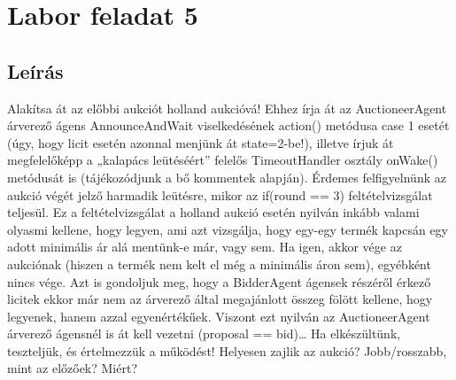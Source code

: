 \section{Labor feladat 5}
\subsection{Leírás}
Alakítsa át az előbbi aukciót holland aukcióvá! Ehhez írja át az AuctioneerAgent
árverező ágens AnnounceAndWait viselkedésének action() metódusa case 1 esetét
(úgy, hogy licit esetén azonnal menjünk át state=2-be!), illetve írjuk át megfelelőképp a
„kalapács leütéséért” felelős TimeoutHandler osztály onWake() metódusát is
(tájékozódjunk a bő kommentek alapján). Érdemes felfigyelnünk az aukció végét jelző
harmadik leütésre, mikor az if(round == 3) feltételvizsgálat teljesül. Ez a
feltételvizsgálat a holland aukció esetén nyilván inkább valami olyasmi kellene, hogy legyen,
ami azt vizsgálja, hogy egy-egy termék kapcsán egy adott minimális ár alá mentünk-e már,
vagy sem. Ha igen, akkor vége az aukciónak (hiszen a termék nem kelt el még a minimális
áron sem), egyébként nincs vége. Azt is gondoljuk meg, hogy a BidderAgent ágensek
részéről érkező licitek ekkor már nem az árverező által megajánlott összeg fölött kellene, hogy
legyenek, hanem azzal egyenértékűek. Viszont ezt nyilván az AuctioneerAgent árverező
ágensnél is át kell vezetni (proposal == bid)… Ha elkészültünk, teszteljük, és
értelmezzük a működést! Helyesen zajlik az aukció? Jobb/rosszabb, mint az előzőek? Miért?
